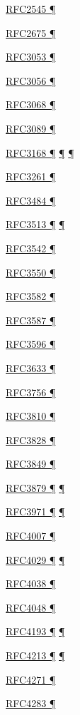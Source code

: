 \documentclass[
]{article}
\begin{document}
\hyperref[routing]{RFC2545 ¶}

\hyperref[packet-size-and-jumbo-frames]{RFC2675 ¶}

\hyperref[obsolete-techniques]{RFC3053 ¶}

\hyperref[obsolete-techniques]{RFC3056 ¶}

\hyperref[obsolete-techniques]{RFC3068 ¶}

\hyperref[obsolete-techniques]{RFC3089 ¶}

\hyperref[packet-format]{RFC3168 ¶}
\hyperref[traffic-class-and-flow-label]{¶}
\hyperref[transport-protocols]{¶}

\hyperref[transport-protocols]{RFC3261 ¶}

\hyperref[source-and-destination-address-selection]{RFC3484 ¶}

\hyperref[obsolete-features-in-ipv6]{RFC3513 ¶}
\hyperref[markdown-usage]{¶}

\hyperref[dual-stack-scenarios]{RFC3542 ¶}

\hyperref[transport-protocols]{RFC3550 ¶}

\hyperref[multihoming]{RFC3582 ¶}

\hyperref[addresses]{RFC3587 ¶}

\hyperref[dns]{RFC3596 ¶}

\hyperref[managed-configuration]{RFC3633 ¶}

\hyperref[layer-2-considerations]{RFC3756 ¶}

\hyperref[address-resolution]{RFC3810 ¶}

\hyperref[transport-protocols]{RFC3828 ¶}

\hyperref[addresses]{RFC3849 ¶}

\hyperref[addresses]{RFC3879 ¶} \hyperref[obsolete-features-in-ipv6]{¶}

\hyperref[security]{RFC3971 ¶} \hyperref[layer-2-considerations]{¶}

\hyperref[addresses]{RFC4007 ¶}

\hyperref[layer-2-functions]{RFC4029 ¶} \hyperref[tunnels]{¶}

\hyperref[addresses]{RFC4038 ¶}

\hyperref[addresses]{RFC4048 ¶}

\hyperref[filtering]{RFC4193 ¶} \hyperref[multihoming]{¶}

\hyperref[dual-stack-scenarios]{RFC4213 ¶} \hyperref[tunnels]{¶}

\hyperref[routing]{RFC4271 ¶}

\hyperref[obsolete-features-in-ipv6]{RFC4283 ¶}
\end{document}
